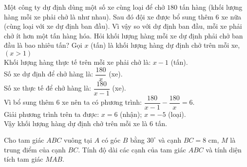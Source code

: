 \begin{ex}%
    Một công ty dự định dùng một số xe cùng loại để chở $180$ tấn hàng (khối lượng hàng mỗi xe phải chở là như nhau). Sau đó đội xe được bổ sung thêm $6$ xe nữa (cùng loại với xe dự định ban đầu). Vì vậy so với dự định ban đầu, mỗi xe phải chở ít hơn một tấn hàng hóa. Hỏi khối lượng hàng mỗi xe dự định phải chở ban đầu là bao nhiêu tấn?
    \loigiai
    {Gọi $x$ (tấn) là khối lượng hàng dự định chở trên mỗi xe, $(x>1)$\\
    	Khối lượng hàng thực tế trên mỗi xe phải chở là: $x-1$ (tấn).\\
    	Số xe dự định để chở hàng là: $\dfrac{180}{x}$ (xe).\\
    	Số xe thực tế để chở hàng là: $\dfrac{180}{x-1}$ (xe).\\
    	Vì bổ sung thêm 6 xe nên ta có phương trình: $\dfrac{180}{x-1}-\dfrac{180}{x}=6$.\\
    	Giải phương trình trên ta được: $x=6$ (nhận); $x=-5$ (loại).\\
    	Vậy khối lượng hàng dự định chở trên mỗi xe là 6 tấn.
    }
\end{ex}

\begin{ex}%
    Cho tam giác $ABC$ vuông tại $A$ có góc $B$ bằng $30^{\circ}$ và cạnh $BC=8$ cm, $M$ là trung điểm của cạnh $BC$. Tính độ dài các cạnh của tam giác $ABC$ và tính diện tích tam giác $MAB$.
\end{ex}

